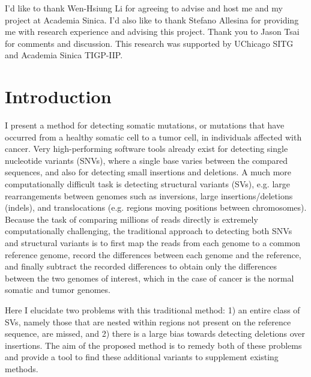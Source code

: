 \documentclass{easychithesis}
\begin{document}
I'd like to thank Wen-Hsiung Li for agreeing to advise and host me and my project at Academia Sinica. I'd also like to thank Stefano Allesina for providing me with research experience and advising this project. Thank you to Jason Tsai for comments and discussion. This research was supported by UChicago SITG and Academia Sinica TIGP-IIP.

%
%

\tableofcontents

%
% 

\listoffigures

% 
% 

\listoftables

%
%
\mainmatter

%
%
\chapter{Introduction}

I present a method for detecting somatic mutations, or mutations that have occurred from a healthy somatic cell to a tumor cell, in individuals affected with cancer. Very high-performing software tools already exist for detecting single nucleotide variants (SNVs), where a single base varies between the compared sequences, and also for detecting small insertions and deletions. A much more computationally difficult task is detecting structural variants (SVs), e.g. large rearrangements between genomes such as inversions, large insertions/deletions (indels), and translocations (e.g. regions moving positions between chromosomes). Because the task of comparing millions of reads directly is extremely computationally challenging, the traditional approach to detecting both SNVs and structural variants is to first map the reads from each genome to a common reference genome, record the differences between each genome and the reference, and finally subtract the recorded differences to obtain only the differences between the two genomes of interest, which in the case of cancer is the normal somatic and tumor genomes.

Here I elucidate two problems with this traditional method: 1) an entire class of SVs, namely those that are nested within regions not present on the reference sequence, are missed, and 2) there is a large bias towards detecting deletions over insertions. The aim of the proposed method is to remedy both of these problems and provide a tool to find these additional variants to supplement existing methods. 
\end{document}
